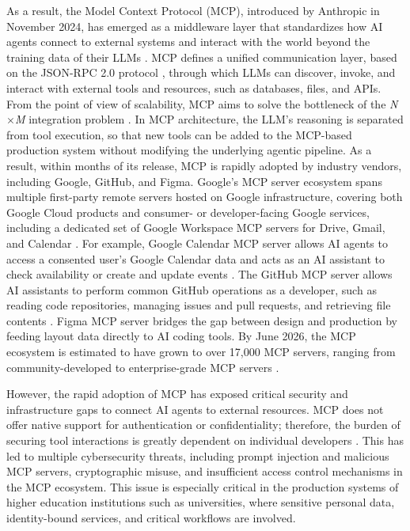 \documentclass[english, 12pt, a4paper, elec, utf8, a-2b, online]{aaltothesis}
\begin{document}
As a result, the Model Context Protocol (MCP), introduced by Anthropic in November 2024, has emerged as a middleware layer that standardizes how AI agents connect to external systems and interact with the world beyond the training data of their LLMs \cite{anthropic_mcp_intro}.
MCP defines a unified communication layer, based on the JSON-RPC 2.0 protocol \cite{jsonrpc2020}, through which LLMs can discover, invoke, and interact with external tools and resources, such as databases, files, and APIs.
From the point of view of scalability, MCP aims to solve the bottleneck of the \textit{N$\times$M} integration problem \cite{ray2025survey}.
In MCP architecture, the LLM's reasoning is separated from tool execution, so that new tools can be added to the MCP-based production system without modifying the underlying agentic pipeline. 
As a result, within months of its release, MCP is rapidly adopted by industry vendors, including Google, GitHub, and Figma.
Google's MCP server ecosystem spans multiple first-party remote servers hosted on Google infrastructure, covering both Google Cloud products and consumer- or developer-facing Google services, including a dedicated set of Google Workspace MCP servers for Drive, Gmail, and Calendar \cite{google_mcp2026}.
For example, Google Calendar MCP server allows AI agents to access a consented user's Google Calendar data and acts as an AI assistant to check availability or create and update events \cite{google_calendar_mcp}.
The GitHub MCP server allows AI assistants to perform common GitHub operations as a developer, such as reading code repositories, managing issues and pull requests, and retrieving file contents \cite{github-mcp-server}.
Figma MCP server bridges the gap between design and production by feeding layout data directly to AI coding tools. 
By June 2026, the MCP ecosystem is estimated to have grown to over 17,000 MCP servers, ranging from community-developed to enterprise-grade MCP servers \cite{glama_mcp_servers_2026}. 

However, the rapid adoption of MCP has exposed critical security and infrastructure gaps to connect AI agents to external resources. 
MCP does not offer native support for authentication or confidentiality; therefore, the burden of securing tool interactions is greatly dependent on individual developers \cite{yan2025mcpmisuse}. 
This has led to multiple cybersecurity threats, including prompt injection and malicious MCP servers, cryptographic misuse, and insufficient access control mechanisms in the MCP ecosystem. 
This issue is especially critical in the production systems of higher education institutions such as universities, where sensitive personal data, identity-bound services, and critical workflows are involved. 
\end{document}
